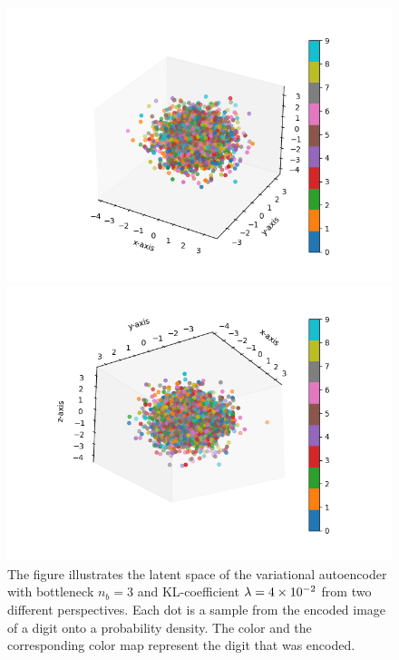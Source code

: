 \begin{figure}
\begin{center}
   \begin{minipage}[b]{0.49\linewidth}
      \includegraphics[trim = 20mm 10mm 20mm 10mm, clip, width=\linewidth]{convolutional_VAE_snd_KL_4e-2_5k_epochs_3D_latent_1}
	\end{minipage}
   \begin{minipage}[b]{0.49\linewidth}
      \includegraphics[trim = 20mm 10mm 20mm 10mm, clip, width=\linewidth]{convolutional_VAE_snd_KL_4e-2_5k_epochs_3D_latent_2}
	\end{minipage}
\end{center}
\caption{The figure illustrates the latent space of the variational autoencoder with bottleneck $n_b=3$ and KL-coefficient $\lambda = \num{4e-2}$ from two different perspectives. Each dot is a sample from the encoded image of a digit onto a probability density. The color and the corresponding color map represent the digit that was encoded.}\label{fig:convolutional_VAE_snd_KL_4e-2_5k_epochs_3D_latent}
\end{figure}


